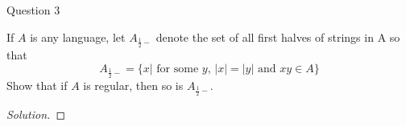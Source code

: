 \begin{solution}{Question 3}\label{ques:3}
    \begin{question}
    If $A$ is any language, let $A_{\frac{1}{2} -}$ denote the set of all first halves of strings in A so that
    \begin{equation}
        A_{\frac{1}{2} -} = \{x | \text{ for some $y$, }|x| = |y| \text{ and } xy \in A\}
    \end{equation}
    Show that if $A$ is regular, then so is $A_{\frac{1}{2} -}$.
    \end{question}
    \tcblower{}
    \begin{proof}[Solution]
    \end{proof}
\end{solution}
